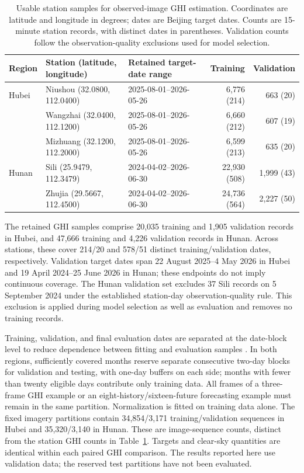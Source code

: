 \begin{table}[!htbp]\centering\small
\caption{Usable station samples for observed-image GHI estimation. Coordinates are latitude and longitude in degrees; dates are Beijing target dates. Counts are 15-minute station records, with distinct dates in parentheses. Validation counts follow the observation-quality exclusions used for model selection.}\label{tab:data}
\begin{tabularx}{\linewidth}{llXrr}\toprule
Region & Station (latitude, longitude) & Retained target-date range & Training & Validation\\\midrule
Hubei & Niushou (32.0800, 112.0400) & 2025-08-01--2026-05-26 & 6,776 (214) & 663 (20)\\
 & Wangzhai (32.0400, 112.1200) & 2025-08-01--2026-05-26 & 6,660 (212) & 607 (19)\\
 & Mizhuang (32.1200, 112.2000) & 2025-08-01--2026-05-26 & 6,599 (213) & 635 (20)\\
Hunan & Sili (25.9479, 112.3479) & 2024-04-02--2026-06-30 & 22,930 (508) & 1,999 (43)\\
 & Zhujia (29.5667, 112.4500) & 2024-04-02--2026-06-30 & 24,736 (564) & 2,227 (50)\\\bottomrule
\end{tabularx}
\end{table}

The retained GHI samples comprise 20,035 training and 1,905 validation records in Hubei, and 47,666 training and 4,226 validation records in Hunan. Across stations, these cover 214/20 and 578/51 distinct training/validation dates, respectively. Validation target dates span 22 August 2025--4 May 2026 in Hubei and 19 April 2024--25 June 2026 in Hunan; these endpoints do not imply continuous coverage. The Hunan validation set excludes 37 Sili records on 5 September 2024 under the established station-day observation-quality rule. This exclusion is applied during model selection as well as evaluation and removes no training records.

Training, validation, and final evaluation dates are separated at the date-block level to reduce dependence between fitting and evaluation samples \cite{roberts2017}. In both regions, sufficiently covered months reserve separate consecutive two-day blocks for validation and testing, with one-day buffers on each side; months with fewer than twenty eligible days contribute only training data. All frames of a three-frame GHI example or an eight-history/sixteen-future forecasting example must remain in the same partition. Normalization is fitted on training data alone. The fixed imagery partitions contain 34,854/3,171 training/validation sequences in Hubei and 35,320/3,140 in Hunan. These are image-sequence counts, distinct from the station GHI counts in Table~\ref{tab:data}. Targets and clear-sky quantities are identical within each paired GHI comparison. The results reported here use validation data; the reserved test partitions have not been evaluated.

